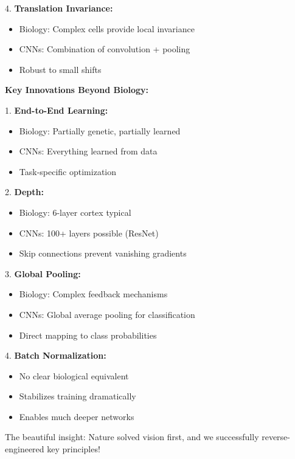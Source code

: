 \documentclass[12pt]{article}
\newcommand{\explanation}[1]{{\color{explanationcolor}#1}}
\begin{document}
\begin{enumerate}[(a)]
{{    4. \textbf{Translation Invariance:}
    \begin{itemize}
        \item Biology: Complex cells provide local invariance
        \item CNNs: Combination of convolution + pooling
        \item Robust to small shifts
    \end{itemize}
    }
    
    \textbf{Key Innovations Beyond Biology:}
    
    \explanation{
    1. \textbf{End-to-End Learning:}
    \begin{itemize}
        \item Biology: Partially genetic, partially learned
        \item CNNs: Everything learned from data
        \item Task-specific optimization
    \end{itemize}
    
    2. \textbf{Depth:}
    \begin{itemize}
        \item Biology: 6-layer cortex typical
        \item CNNs: 100+ layers possible (ResNet)
        \item Skip connections prevent vanishing gradients
    \end{itemize}
    
    3. \textbf{Global Pooling:}
    \begin{itemize}
        \item Biology: Complex feedback mechanisms
        \item CNNs: Global average pooling for classification
        \item Direct mapping to class probabilities
    \end{itemize}
    
    4. \textbf{Batch Normalization:}
    \begin{itemize}
        \item No clear biological equivalent
        \item Stabilizes training dramatically
        \item Enables much deeper networks
    \end{itemize}
    
    The beautiful insight: Nature solved vision first, and we successfully reverse-engineered key principles!
    }
    }
    

\end{enumerate}
\end{document}
